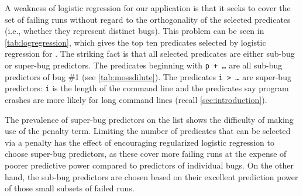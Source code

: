 A weakness of logistic regression for our application is that it seeks
to cover the set of failing runs without regard to the orthogonality
of the selected predicates (i.e., whether they represent distinct
bugs).  This problem can be seen in \autoref{tab:logregression},
which gives the top ten predicates selected by logistic regression
for \moss.  The striking fact is that all selected predicates are
either sub-bug or super-bug predictors.  The predicates beginning with
\texttt{p + \ldots} are all sub-bug predictors of bug \#1 (see
\autoref{tab:mossdilute}).  The predicates \texttt{i > \ldots} are
super-bug predictors: \texttt{i} is the length of the command line and
the predicates say program crashes are more likely for long command
lines (recall \autoref{sec:introduction}).

The prevalence of super-bug predictors on the list shows the
difficulty of making use of the penalty term.  Limiting the number of
predicates that can be selected via a penalty has the effect of
encouraging regularized logistic regression to choose super-bug predictors, as
these cover more failing runs at the expense of poorer predictive
power compared to predictors of individual bugs.  On the other hand,
the sub-bug predictors are chosen based on their excellent prediction
power of those small subsets of failed runs.

